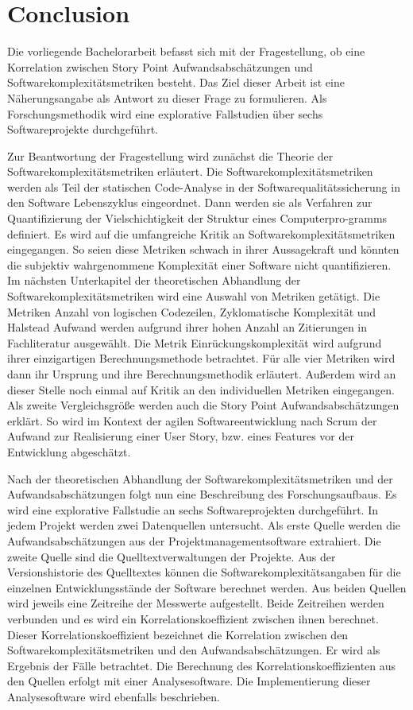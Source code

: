 \chapter{Conclusion}\label{conclusion}

Die vorliegende Bachelorarbeit befasst sich mit der Fragestellung, ob
eine Korrelation zwischen Story Point Aufwandsabschätzungen und
Softwarekomplexitätsmetriken besteht. Das Ziel dieser Arbeit ist eine
Näherungsangabe als Antwort zu dieser Frage zu formulieren. Als
Forschungsmethodik wird eine explorative Fallstudien über sechs
Softwareprojekte durchgeführt.

Zur Beantwortung der Fragestellung wird zunächst die Theorie der
Softwarekomplexitätsmetriken erläutert. Die Softwarekomplexitätsmetriken
werden als Teil der statischen Code-Analyse in der
Softwarequalitätssicherung in den Software Lebenszyklus eingeordnet.
Dann werden sie als Verfahren zur Quantifizierung der Vielschichtigkeit
der Struktur eines Computerpro-gramms definiert. Es wird auf die
umfangreiche Kritik an Softwarekomplexitätsmetriken eingegangen. So
seien diese Metriken schwach in ihrer Aussagekraft und könnten die
subjektiv wahrgenommene Komplexität einer Software nicht quantifizieren.
Im nächsten Unterkapitel der theoretischen Abhandlung der
Softwarekomplexitätsmetriken wird eine Auswahl von Metriken getätigt.
Die Metriken Anzahl von logischen Codezeilen, Zyklomatische Komplexität
und Halstead Aufwand werden aufgrund ihrer hohen Anzahl an Zitierungen
in Fachliteratur ausgewählt. Die Metrik Einrückungskomplexität wird
aufgrund ihrer einzigartigen Berechnungsmethode betrachtet. Für alle
vier Metriken wird dann ihr Ursprung und ihre Berechnungsmethodik
erläutert. Au\ss erdem wird an dieser Stelle noch einmal auf Kritik an den
individuellen Metriken eingegangen. Als zweite Vergleichsgrö\ss e werden
auch die Story Point Aufwandsabschätzungen erklärt. So wird im Kontext
der agilen Softwareentwicklung nach Scrum der Aufwand zur Realisierung
einer User Story, bzw. eines Features vor der Entwicklung abgeschätzt.

Nach der theoretischen Abhandlung der Softwarekomplexitätsmetriken und
der Aufwandsabschätzungen folgt nun eine Beschreibung des
Forschungsaufbaus. Es wird eine explorative Fallstudie an sechs
Softwareprojekten durchgeführt. In jedem Projekt werden zwei
Datenquellen untersucht. Als erste Quelle werden die
Aufwandsabschätzungen aus der Projektmanagementsoftware extrahiert. Die
zweite Quelle sind die Quelltextverwaltungen der Projekte. Aus der
Versionshistorie des Quelltextes können die Softwarekomplexitätsangaben
für die einzelnen Entwicklungsstände der Software berechnet werden. Aus
beiden Quellen wird jeweils eine Zeitreihe der Messwerte aufgestellt.
Beide Zeitreihen werden verbunden und es wird ein
Korrelationskoeffizient zwischen ihnen berechnet. Dieser
Korrelationskoeffizient bezeichnet die Korrelation zwischen den
Softwarekomplexitätsmetriken und den Aufwandsabschätzungen. Er wird als
Ergebnis der Fälle betrachtet. Die Berechnung des
Korrelationskoeffizienten aus den Quellen erfolgt mit einer
Analysesoftware. Die Implementierung dieser Analysesoftware wird
ebenfalls beschrieben.

